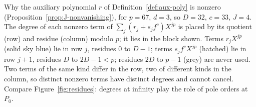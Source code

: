 \caption{Why the auxiliary polynomial $r$ of Definition~\ref{def:aux-poly}
is nonzero (Proposition~\ref{prop:J-nonvanishing}), for $p=67$, $d=3$, so
$D=32$, $c=33$, $J=4$. The degree of each nonzero term of
$\sum_j(r_j+s_jf^c)X^{jp}$ is placed by its quotient (row) and residue
(column) modulo $p$; it lies in the block shown. Terms $r_jX^{jp}$ (solid
sky blue) lie in row $j$, residues $0$ to $D-1$; terms $s_jf^cX^{jp}$
(hatched) lie in row $j+1$, residues $D$ to $2D-1<p$; residues $2D$ to
$p-1$ (grey) are never used. Two terms of the same kind differ in the row,
two of different kinds in the column, so distinct nonzero terms have
distinct degrees and cannot cancel. Compare Figure~\ref{fig:residues}:
degrees at infinity play the role of pole orders at $P_0$.}
\label{fig:J-degrees}
